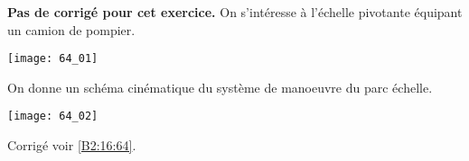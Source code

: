 \normaltrue \difficilefalse \tdifficilefalse
\correctionfalse

\exer{ $\star$ \label{B2:16:64}}
\setcounter{numques}{0}


\ifcorrection
\else
\textbf{Pas de corrigé pour cet exercice.}
\fi
On s'intéresse à l'échelle pivotante équipant un camion de pompier.


\begin{center}
\texttt{[image: 64\_01]}
\end{center}

On donne un schéma cinématique du système de manoeuvre du parc échelle.

\begin{center}
\texttt{[image: 64\_02]}
\end{center}

\ifprof
\else 
\fi

\ifprof
\else 
\fi

\ifprof
\else 
\fi
 
 

\ifprof
\else

\noindent\footnotesize
\normalsize

\begin{flushright}
\footnotesize{Corrigé  voir \ref{B2:16:64}.}
\end{flushright}%
\fi